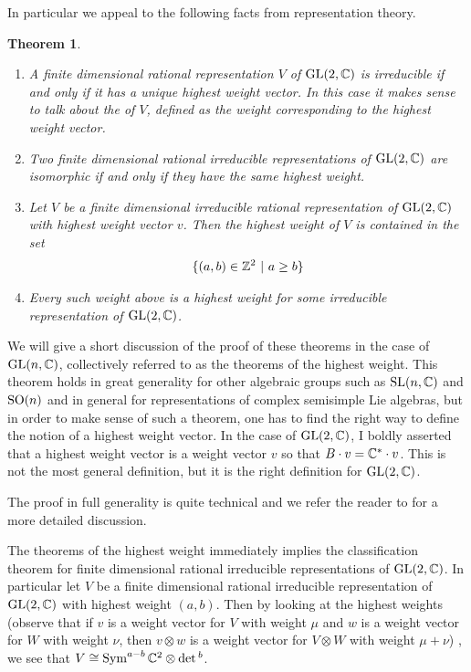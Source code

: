 \documentclass{amsart}
\numberwithin{equation}{section}
\theoremstyle{plain} %
\newtheorem{theorem}[equation]{Theorem}
\theoremstyle{definition}
\theoremstyle{remark}
\begin{document}
\hfill 

In particular we appeal to the following facts from representation theory.
\begin{theorem}\label{thm:hw}
    \begin{enumerate}
        \item A finite dimensional rational representation $V$ of $\operatorname{GL}(2,\mathbb{C})$ is irreducible if and only if it has a unique highest weight vector.
        In this case it makes sense to talk about the  of $V$, defined as the weight corresponding to the highest weight vector.
        \item Two finite dimensional rational irreducible representations of $\operatorname{GL}(2,\mathbb{C})$ are isomorphic if and only if they have the same highest weight.
        \item Let $V$ be a finite dimensional irreducible rational representation of $\operatorname{GL}(2,\mathbb{C})$ with highest weight vector $v$. Then the highest weight of $V$ is contained in the set \begin{align*}
            \{(a,b)\in \mathbb{Z}^2 \ \vert \  a\geq b \}
        \end{align*}
        \item Every such weight above is a highest weight for some irreducible representation of $\operatorname{GL}(2,\mathbb{C})$.
    \end{enumerate}
\end{theorem}

We will give a short discussion of the proof of these theorems in the case of $\operatorname{GL}(n,\mathbb{C})$, collectively referred to as the theorems of the highest weight.
This theorem holds in great generality for other algebraic groups such as $\operatorname{SL}(n,\mathbb{C})$ and $\operatorname{SO}(n)$ and in general for representations of complex semisimple Lie algebras,
but in order to make sense of such a theorem, one has to find the right way to define the notion of a highest weight vector.
In the case of $\operatorname{GL}(2,\mathbb{C})$, I boldly asserted that a highest weight vector is a weight vector $v$
 so that $B\cdot v = \mathbb{C}^*\cdot v$. This is not the most general definition, but it is the
right definition for $\operatorname{GL}(2,\mathbb{C})$.

\hfill 

The proof in full generality is quite technical and we refer the reader to \cite{milne} for a more detailed discussion.

\hfill

The theorems of the highest weight immediately implies the classification theorem for finite dimensional rational irreducible representations of $\operatorname{GL}(2,\mathbb{C})$.
In particular let $V$ be a finite dimensional rational irreducible representation of $\operatorname{GL}(2,\mathbb{C})$ with highest weight $(a,b)$. Then
by looking at the highest weights (observe that if $v$ is a weight vector for $V$ with weight $\mu$ and 
$w$ is a weight vector for $W$ with weight $\nu$, then $v\otimes w$ is a weight vector for $V\otimes W$ with weight $\mu + \nu$)
, we see that $V \cong \operatorname{Sym}^{a-b}\mathbb{C}^2 \otimes \det{}^{b}$. 
\end{document}
